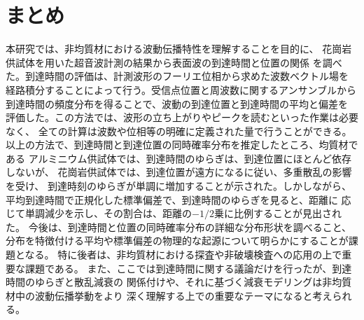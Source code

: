 \documentclass{jsce}
\begin{document}
\section{まとめ}
本研究では、非均質材における波動伝播特性を理解することを目的に、
花崗岩供試体を用いた超音波計測の結果から表面波の到達時間と位置の関係
を調べた。到達時間の評価は、計測波形のフーリエ位相から求めた波数ベクトル場を
経路積分することによって行う。受信点位置と周波数に関するアンサンブルから
到達時間の頻度分布を得ることで、波動の到達位置と到達時間の平均と偏差を
評価した。この方法では、波形の立ち上がりやピークを読むといった作業は必要なく、
全ての計算は波数や位相等の明確に定義された量で行うことができる。
以上の方法で、到達時間と到達位置の同時確率分布を推定したところ、均質材である
アルミニウム供試体では、到達時間のゆらぎは、到達位置にほとんど依存しないが、
花崗岩供試体では、到達位置が遠方になるに従い、多重散乱の影響を受け、
到達時刻のゆらぎが単調に増加することが示された。しかしながら、
平均到達時間で正規化した標準偏差で、到達時間のゆらぎを見ると、距離に
応じて単調減少を示し、その割合は、距離の$-1/2$乗に比例することが見出された。
今後は、到達時間と位置の同時確率分布の詳細な分布形状を調べること、
分布を特徴付ける平均や標準偏差の物理的な起源について明らかにすることが課題となる。
特に後者は、非均質材における探査や非破壊検査への応用の上で重要な課題である。
また、ここでは到達時間に関する議論だけを行ったが、到達時間のゆらぎと散乱減衰の
関係付けや、それに基づく減衰モデリングは非均質材中の波動伝播挙動をより
深く理解する上での重要なテーマになると考えられる。
\vspace{0mm}
\end{document}
